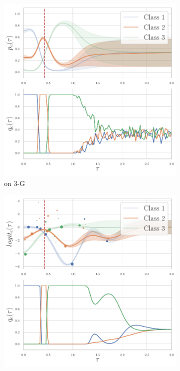 \begin{figure}
\centering
    \begin{subfigure}{.24\textwidth}
        \centering
        \includegraphics[width=\linewidth]{images/shifted-gaussians-dirichlet.pdf}
        \caption*{\DirModel on 3-G}
    \end{subfigure}
    \begin{subfigure}{.24\textwidth}
        \centering
        \includegraphics[width=\linewidth]{images/shifted-gaussians-gaussian-process.pdf}

\end{subfigure}
\end{figure}
